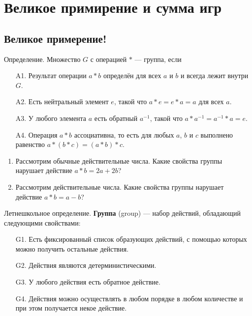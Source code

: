 \documentclass[12pt]{article} %
\begin{document}



\newpage
\section{Великое примирение и сумма игр}

\subsection{Великое примерение!}

Определение. Множество $G$ с операцией $*$ — группа, если
\begin{enumerate}
  \item[A1.] Результат операции $a * b$ определён для всех $a$ и $b$ и всегда лежит внутри $G$.
  \item[A2.] Есть нейтральный элемент $e$, такой что $a*e=e*a=a$ для всех $a$.
  \item[A3.] У любого элемента $a$ есть обратный $a^{-1}$, такой что $a*a^{-1}=a^{-1}*a=e$.
  \item[A4.] Операция $a * b$ ассоциативна, то есть для любых $a$, $b$ и $c$ выполнено равенство $a * (b * c) = (a * b) * c$.
\end{enumerate}

\begin{enumerate}
  \item Рассмотрим обычные действительные числа. Какие свойства группы нарушает действие $a * b = 2a + 2b$?
  \item Рассмотрим действительные числа. Какие свойства группы нарушает действие $a * b = a - b$?
\end{enumerate}


Летнешкольное определение. \textbf{Группа} (group) — набор действий, обладающий следующими свойствами:
\begin{enumerate}
  \item[G1.] Есть фиксированный список образующих действий, с помощью которых можно получить остальные действия.
  \item[G2.] Действия являются детерминистическими.
  \item[G3.] У любого действия есть обратное действие.
  \item[G4.] Действия можно осуществлять в любом порядке в любом количестве и при этом получается некое действие.
\end{enumerate}
\end{document}
